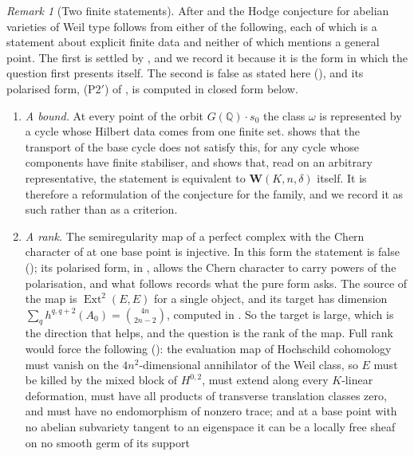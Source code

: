 \documentclass[11pt,reqno]{amsart}
\theoremstyle{plain}
\theoremstyle{definition}
\theoremstyle{remark}
\newtheorem{remark}[theorem]{Remark}
\newcommand{\QQ}{\mathbb{Q}}
\DeclareMathOperator{\Ext}{Ext}
\begin{document}
\begin{remark}[Two finite statements]
\label{rem:tworemain}
After \cite[Theorem~16.9]{paperI} and  the Hodge
conjecture for abelian varieties of Weil type follows from either of the
following, each of which is a statement about explicit finite data and neither
of which mentions a general point. The first is settled by
\cite[Theorem~16.17]{paperI}, and we record it because it is the form in which the
question first presents itself. The second is false as stated here
(), and its polarised form, \textup{(P2$'$)} of
, is computed in closed form below.

\begin{enumerate}[label=\textup{(P\arabic*)},leftmargin=*]
\item \emph{A bound.} At every point of the orbit $G(\QQ)\cdot s_{0}$ the
  class $\omega$ is represented by a cycle whose Hilbert data comes from one
  finite set. \cite[Theorem~16.15]{paperI} shows that the transport of the base cycle
  does not satisfy this, for any cycle whose components have finite
  stabiliser, and \cite[Theorem~16.17]{paperI} shows that, read on an arbitrary
  representative, the statement is equivalent to $\mathbf{W}(K,n,\delta)$
  itself. It is therefore a reformulation of the conjecture for the family,
  and we record it as such rather than as a criterion.
\item \emph{A rank.} The semiregularity map of a perfect complex with the
  Chern character of  at one base point is injective.
  In this form the statement is false (); its polarised
  form, in , allows the Chern character to carry powers of
  the polarisation, and what follows records what the pure form asks. The
  source of the map is $\Ext^{2}(E,E)$ for a single object, and its target
  has dimension $\sum_{q}h^{q,q+2}(A_{0})=\binom{4n}{2n-2}$, computed in
  \cite[Proposition~9.2]{paperI}. So the target is large, which is the direction that
  helps, and the question is the rank of the map. Full rank would force the
  following (): the evaluation map of
  Hochschild cohomology must vanish on the $4n^{2}$-dimensional annihilator of
  the Weil class, so $E$ must be killed by the mixed block of $H^{0,2}$, must
  extend along every $K$-linear deformation, must have all products of
  transverse translation classes zero, and must have no endomorphism of
  nonzero trace; and at a base point with no abelian subvariety tangent to an
  eigenspace it can be a locally free sheaf on no smooth germ of its support

\end{enumerate}
\end{remark}
\end{document}
